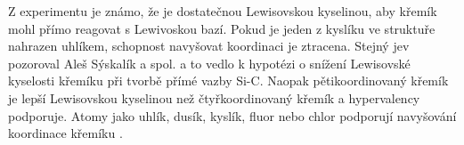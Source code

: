 \documentclass[
digital, %
table,   %
lof,     %
lot,     %
oneside,
]{fithesis3}
\begin{document}
\begin{figure}
\begin{center}
\label{shrnuti_struktury_kremik}
\end{center}
\end{figure}
Z experimentu je známo, že  je dostatečnou Lewisovskou kyselinou, aby křemík mohl přímo reagovat s Lewivoskou bazí. Pokud je jeden z kyslíku ve struktuře nahrazen uhlíkem, schopnost navyšovat koordinaci je ztracena. Stejný jev pozoroval Aleš Sýskalík a spol. \cite{Styskalik2015thesis} a to vedlo k hypotézi o snížení Lewisovské kyselosti křemíku při tvorbě přímé vazby Si-C. Naopak pětikoordinovaný křemík je lepší Lewisovskou kyselinou než čtyřkoordinovaný křemík a hypervalency podporuje. Atomy jako uhlík, dusík, kyslík, fluor nebo chlor podporují navyšování koordinace křemíku \cite{Wagler2014}.\\
\end{document}
